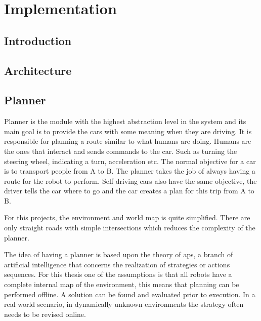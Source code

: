 \chapter{Implementation}
\label{chp:Implementation} 

\section{Introduction}

\section{Architecture}

\section{Planner}

Planner is the module with the highest abstraction level in the system and its main goal is to provide the cars with some meaning when they are driving. It is responsible for planning a route similar to what humans are doing. Humans are the ones that interact and sends commands to the car. Such as turning the steering wheel, indicating a turn, acceleration etc. The normal objective for a car is to transport people from A to B. The planner takes the job of always having a route for the robot to perform. Self driving cars also have the same objective, the driver tells the car where to go and the car creates a plan for this trip from A to B. 

\noindent For this projects, the environment and world map is quite simplified. There are only straight roads with simple intersections which reduces the complexity of the planner.

\noindent The idea of having a planner is based upon the theory of \gls{aps}, a branch of artificial intelligence that concerns the realization of strategies or actions sequences. For this thesis one of the assumptions is that all robots have a complete internal map of the environment, this means that planning can be performed offline. A solution can be found and evaluated prior to execution. In a real world scenario, in dynamically unknown environments the strategy often needs to be revised online. 


